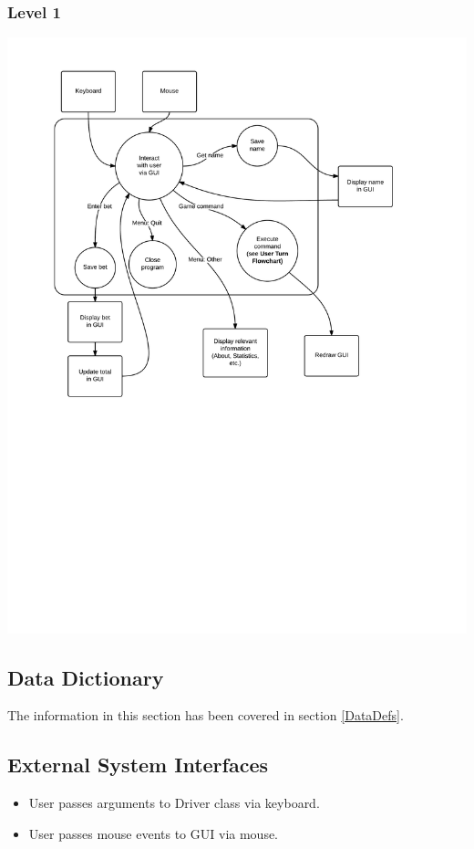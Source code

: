 \documentclass{article}
\begin{document}
\subsubsection{Level 1}
\includegraphics[width=\textwidth]{Level1DFD}


\subsection{Data Dictionary}

The information in this section has been covered in section \ref{DataDefs}.

\subsection{External System Interfaces}
\begin{itemize}
\item User passes arguments to Driver class via keyboard.
\item User passes mouse events to GUI via mouse.
\end{itemize}
\end{document}

